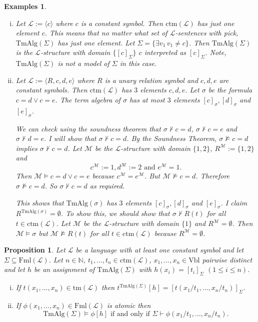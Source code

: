 \documentclass[11pt]{article}
\newcommand{\TmAlg}{\mathrm{TmAlg}}
\newcommand{\tm}{\textrm{tm}}
\newcommand{\ctm}{\textrm{ctm}}
\newcommand{\Fml}{\textrm{Fml}}
\newcommand{\Vbl}{\textrm{Vbl}}
\newtheorem{proposition}[theorem]{Proposition}
\newtheorem{examples}[theorem]{Examples}
\newcommand{\mcal}[1]{\mathcal{#1}}
\newcommand{\N}{\mathbb{N}}
\begin{document}
\begin{examples}\label{termalgex}
\
\begin{enumerate}[(i)]
\item Let $\mcal{L}:=\langle c\rangle$ where $c$ is a constant symbol. Then $\ctm(\mcal{L})$ has just one element $c$. This means that no matter what set of $\mcal{L}$-sentences with pick, $\TmAlg(\Sigma)$ has just one element. Let $\Sigma=\{\exists v_1 \, v_1\neq c \}$. Then $\TmAlg(\Sigma)$ is the $\mcal{L}$-structure with domain $\{[c]_\Sigma\}$  $c$ interpreted as $[c]_\Sigma$. Note, $\TmAlg(\Sigma)$ is not a model of $\Sigma$ in this case.
\item Let $\mcal{L}:=\langle R, c,d,e\rangle$ where $R$ is a unary relation symbol and $c,d,e$ are constant symbols. Then $\ctm(\mcal{L})$ has $3$ elements $c,d,e$. Let $\sigma$ be the formula $c=d\vee c=e$. The term algebra of $\sigma$ has at most $3$ elements $[c]_\sigma,[d]_\sigma$ and $[e]_\sigma$.

We can check using the soundness theorem that $\sigma\nvdash c=d$, $\sigma\nvdash c=e$ and $\sigma\nvdash d=e$. I will show that  $\sigma\nvdash c=d$. By the Soundness Theorem, $\sigma\nvDash c=d$ implies $\sigma\nvdash c=d$. Let $\mcal{M}$ be the $\mcal{L}$-structure with domain $\{1,2\}$, $R^{\mcal{M}}:=\{1,2\}$ and
\[c^{\mcal{M}}:=1, d^{\mcal{M}}:=2 \text{ and } e^{\mcal{M}}=1.\] Then $\mcal{M}\models c=d\vee c=e$ because $c^{\mcal{M}}=e^{\mcal{M}}$. But $\mcal{M}\nvDash c=d$. Therefore $\sigma\nvDash c=d$. So $\sigma\nvdash c=d$ as required.

This shows that $\TmAlg(\sigma)$ has $3$ elements $[c]_\sigma,[d]_\sigma$ and $[e]_\sigma$. I claim $R^{\TmAlg(\sigma)}=\emptyset$. To show this, we should show that $\sigma\nvdash R(t)$ for all $t\in\ctm(\mcal{L})$. Let $\mcal{M}$ be the $\mcal{L}$-structure with domain $\{1\}$ and $R^{\mcal{M}}=\emptyset$. Then $\mcal{M}\models \sigma$ but $\mcal{M}\nvDash R(t)$ for all $t\in\ctm(\mcal{L})$ because $R^{\mcal{M}}=\emptyset$.

\end{enumerate}

\end{examples}

\begin{proposition}\label{tmalggoodat}
Let $\mcal{L}$ be a language with at least one constant symbol
and let $\Sigma \subseteq \Fml(\mcal{L}) $.
Let $n\in \N$, $t_1,...,t_n\in \ctm(\mcal{L}) $, $x_1,...,x_n\in \Vbl $ pairwise distinct
and let
$h$ be an assignment of $\TmAlg(\Sigma) $ with $h(x_i)=[t_i]_\Sigma $
$(1\leq i\leq n)$.
\begin{enumerate}[(i)]
\item If $t(x_1,...,x_n)\in \tm(\mcal{L}) $ then $t^{\TmAlg(\Sigma) }[h]=[t(x_1/t_1,...,x_n/t_n)]_\Sigma$.
\item If $\phi (x_1,...,x_n)\in \Fml(\mcal{L}) $ is atomic then
$$\TmAlg(\Sigma) \models \phi [h]\text{ if and only if } \Sigma \vdash \phi (x_1/t_1,...,x_n/t_n).$$
\end{enumerate}
\end{proposition}
\end{document}
